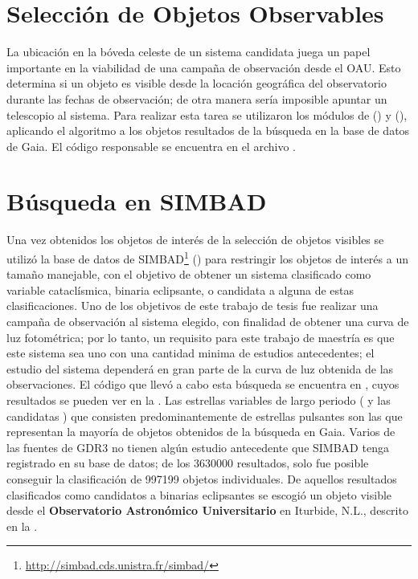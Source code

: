 \section{Selección de Objetos Observables}

La ubicación en la bóveda celeste de un sistema candidata juega un papel
importante en la viabilidad de una campaña de observación desde el OAU. Esto
determina si un objeto es visible desde la locación geográfica del observatorio
durante las fechas de observación; de otra manera sería imposible apuntar un
telescopio al sistema. Para realizar esta tarea se utilizaron los módulos de
 () y  (), aplicando
el algoritmo a los objetos resultados de la búsqueda en la base de datos de
Gaia. El código responsable se encuentra en el archivo
\href{https://github.com/KnightIV/UANL_MAPTA_Observaciones/blob/main/obsrv_plan/gaia/observable_targets.py}{}.

\section{Búsqueda en SIMBAD}

Una vez obtenidos los objetos de interés de la selección de objetos visibles se
utilizó la base de datos de
SIMBAD\footnote{\url{http://simbad.cds.unistra.fr/simbad/}}
() para restringir los objetos de interés a un
tamaño manejable, con el objetivo de obtener un sistema clasificado como
variable cataclísmica, binaria eclipsante, o candidata a alguna de estas
clasificaciones. Uno de los objetivos de este trabajo de tesis fue realizar una
campaña de observación al sistema elegido, con finalidad de obtener una curva de
luz fotométrica; por lo tanto, un requisito para este trabajo de maestría es que
este sistema sea uno con una cantidad minima de estudios antecedentes; el
estudio del sistema dependerá en gran parte de la curva de luz obtenida de las
observaciones. El código que llevó a cabo esta búsqueda se encuentra en
\href{https://github.com/KnightIV/UANL_MAPTA_Observaciones/blob/main/obsrv_plan/simbad/categorize_all_targets.ipynb}{},
cuyos resultados se pueden ver en la .
Las estrellas variables de largo periodo ( y las candidatas
) que consisten predominantemente de estrellas
pulsantes son las que representan la mayoría de objetos obtenidos de la búsqueda
en Gaia. Varios de las fuentes de GDR3 no tienen algún estudio antecedente que
SIMBAD tenga registrado en su base de datos; de los \num{3630000} resultados,
solo fue posible conseguir la clasificación de \num{997199} objetos
individuales. De aquellos resultados clasificados como candidatos a binarias
eclipsantes se escogió un objeto visible desde el \textbf{Observatorio
Astronómico Universitario} en Iturbide, N.L., descrito en la
.

